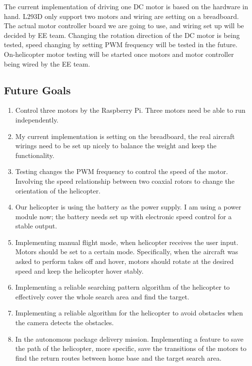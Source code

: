 \documentclass[onecolumn, draftclsnofoot,10pt, compsoc]{IEEEtran}
\begin{document}
The current implementation of driving one DC motor is based on the hardware in hand. L293D only support two motors and wiring are setting on a breadboard. The actual motor controller board we are going to use, and wiring set up will be decided by EE team. Changing the rotation direction of the DC motor is being tested, speed changing by setting PWM frequency will be tested in the future. On-helicopter motor testing will be started once motors and motor controller being wired by the EE team.


\subsection{Future Goals}


\begin{enumerate}
\item{Control three motors by the Raspberry Pi. Three motors need be able to run independently. }
\item{My current implementation is setting on the breadboard, the real aircraft wirings need to be set up nicely to balance the weight and keep the functionality.}
\item{Testing changes the PWM frequency to control the speed of the motor. Involving the speed relationship between two coaxial rotors to change the orientation of the helicopter.}
\item{Our helicopter is using the battery as the power supply. I am using a power module now; the battery needs set up with electronic speed control for a stable output. }
\item{Implementing manual flight mode, when helicopter receives the user input. Motors should be set to a certain mode. Specifically, when the aircraft was asked to perform takes off and hover, motors should rotate at the desired speed and keep the helicopter hover stably.}
\item{Implementing a reliable searching pattern algorithm of the helicopter to effectively cover the whole search area and find the target.}
\item{Implementing a reliable algorithm for the helicopter to avoid obstacles when the camera detects the obstacles.}
\item{In the autonomous package delivery mission. Implementing a feature to save the path of the helicopter, more specific, save the transitions of the motors to find the return routes between home base and the target search area.}
\end{enumerate}
\end{document}
